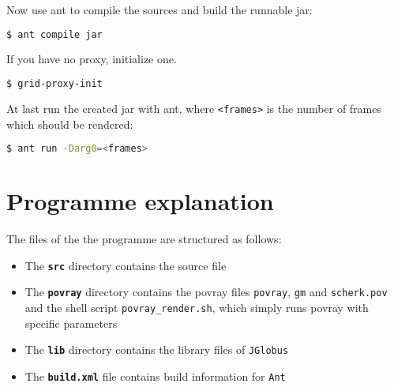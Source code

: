 \documentclass{article}
\begin{document}
Now use ant to compile the sources and build the runnable jar:

\begin{lstlisting}[language=bash]
  $ ant compile jar
\end{lstlisting}

If you have no proxy, initialize one.

\begin{lstlisting}[language=bash]
  $ grid-proxy-init
\end{lstlisting}

At last run the created jar with ant, where \texttt{<frames>} is the number of frames which should be rendered:

\begin{lstlisting}[language=bash]
  $ ant run -Darg0=<frames>
\end{lstlisting}




\section{Programme explanation}
The files of the the programme are structured as follows:

\begin{itemize}
\item The \texttt{\textbf{src}} directory contains the source file
\item The \texttt{\textbf{povray}} directory contains the povray files \texttt{povray}, \texttt{gm} and \texttt{scherk.pov} and the shell script \texttt{povray\_render.sh}, which simply runs povray with specific parameters
\item The \texttt{\textbf{lib}} directory contains the library files of \texttt{JGlobus}
\item The \texttt{\textbf{build.xml}} file contains build information for \texttt{Ant}
\end{itemize}
\end{document}
